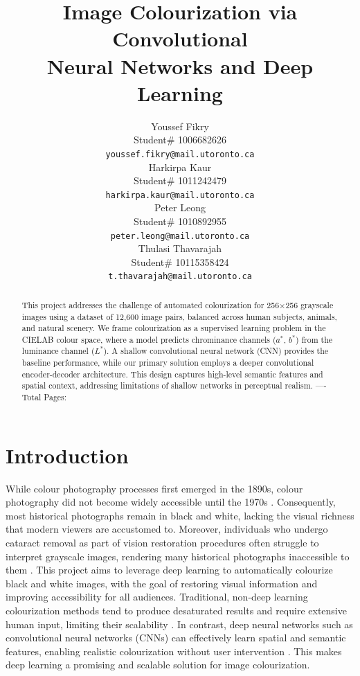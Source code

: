 \documentclass{article} %
\title{Image Colourization via Convolutional \\
Neural Networks and Deep Learning}
\author{Youssef Fikry  \\
Student\# 1006682626\\
\texttt{youssef.fikry@mail.utoronto.ca} \\
\And Harkirpa Kaur  \\
Student\# 1011242479 \\
\texttt{harkirpa.kaur@mail.utoronto.ca} \\
\AND
Peter Leong \\
Student\# 1010892955 \\
\texttt{peter.leong@mail.utoronto.ca} \\
\And
Thulasi Thavarajah \\
Student\# 10115358424 \\
\texttt{t.thavarajah@mail.utoronto.ca} \\
\AND
}
\begin{document}
\maketitle

\begin{abstract}
This project addresses the challenge of automated colourization for 256$\times$256 grayscale images using a dataset of 12,600 image pairs, balanced across human subjects, 
animals, and natural scenery. We frame colourization as a supervised learning problem in the CIELAB colour space, where a model predicts chrominance channels ($a^*$, $b^*$) 
from the luminance channel ($L^*$). A shallow convolutional neural network (CNN) provides the baseline performance, while our primary solution employs a deeper convolutional 
encoder-decoder architecture. This design captures high-level semantic features and spatial context, addressing limitations of shallow networks in perceptual realism.
----Total Pages: \pageref{last_page}
\end{abstract}

\section{Introduction}

While colour photography processes first emerged in the 1890s, colour photography did not become widely accessible until the 1970s \citep{scienceandmediamuseum2020}. 
Consequently, most historical photographs remain in black and white, lacking the visual richness that modern viewers are accustomed to. Moreover, individuals who undergo cataract 
removal as part of vision restoration procedures often struggle to interpret grayscale images, rendering many historical photographs inaccessible to them \citet{vogelsang2024impact}. 
This project aims to leverage deep learning to automatically colourize black and white images, with the goal of restoring visual information and improving accessibility for all audiences. 
Traditional, non-deep learning colourization methods tend to produce desaturated results and require extensive human input, limiting their scalability \citep{cheng2016deepcolorization}. 
In contrast, deep neural networks such as convolutional neural networks (CNNs) can effectively learn spatial and semantic features, enabling realistic colourization without user 
intervention \citep{zhang2016colorful}. This makes deep learning a promising and scalable solution for image colourization.
\end{document}
